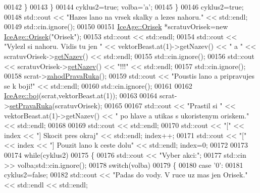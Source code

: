 \begin{DoxyCode}
00142             \}
00143         \}
00144         cyklus2=\textcolor{keyword}{true}; volba=\textcolor{charliteral}{'a'};
00145     \}
00146     cyklus2=\textcolor{keyword}{true};
00148     std::cout << \textcolor{stringliteral}{"Hazes lano na vrsek skalky a lezes nahoru."} << std::endl;
00149     std::cin.ignore();
00150 
00151     \hyperlink{classIceAge_1_1Orisek}{IceAge::Orisek} *scratuvOrisek=\textcolor{keyword}{new} \hyperlink{classIceAge_1_1Orisek}{IceAge::Orisek}(\textcolor{stringliteral}{"Orisek"});
00153     std::cout << std::endl;
00154     std::cout << \textcolor{stringliteral}{"Vylezl si nahoru. Vidis tu jen "} << vektorBeast.at(1)->getNazev() << \textcolor{stringliteral}{" a "} << 
      scratuvOrisek->\hyperlink{classIceAge_1_1Nazev_a09fcdd11a072b4a133cab63cdb4961a0}{getNazev}() << std::endl;
00155     std::cin.ignore();
00156     std::cout << scratuvOrisek->\hyperlink{classIceAge_1_1Nazev_a09fcdd11a072b4a133cab63cdb4961a0}{getNazev}() << \textcolor{stringliteral}{"!!!"} << std::endl;
00157     std::cin.ignore();
00158     scrat->\hyperlink{classIceAge_1_1ObleceneVybaveniVeverky_ac24580a8bfcf97220c1967f58111c8f1}{zahodPravaRuka}();
00159     std::cout << \textcolor{stringliteral}{"Poustis lano a pripravujes se k boji!"} << std::endl;
00160     std::cin.ignore();
00161 
00162     \hyperlink{namespaceIceAge_a2c6b97286bcd54e3ecf2fdc335460e90}{IceAge::boj}(scrat,vektorBeast.at(1));
00163 
00164     scrat->\hyperlink{classIceAge_1_1ObleceneVybaveniVeverky_a81c50b90cae451476735b88f3cdecb07}{setPravaRuka}(scratuvOrisek);
00165 
00167     std::cout << \textcolor{stringliteral}{"Prastil si "} << vektorBeast.at(1)->getNazev() << \textcolor{stringliteral}{" po hlave a utikas s ukoristenym
       oriskem."} << std::endl;
00168 
00169     std::cout << std::endl;
00170     std::cout << \textcolor{stringliteral}{"["} << index << \textcolor{stringliteral}{"] Skocit pres okraj"} << std::endl; index++;
00171     std::cout << \textcolor{stringliteral}{"["} << index << \textcolor{stringliteral}{"] Pouzit lano k ceste dolu"} << std::endl; index=0;
00172 
00173 
00174     \textcolor{keywordflow}{while}(cyklus2)
00175     \{
00176         std::cout << \textcolor{stringliteral}{"Vyber akci:"};
00177         std::cin >> volba;std::cin.ignore();
00178             \textcolor{keywordflow}{switch}(volba)
00179             \{
00180                 \textcolor{keywordflow}{case} \textcolor{charliteral}{'0'}:
00181                     cyklus2=\textcolor{keyword}{false};
00182                     std::cout << \textcolor{stringliteral}{"Padas do vody. V ruce uz mas jen Orisek."} << std::endl << std::endl;

\end{DoxyCode}
